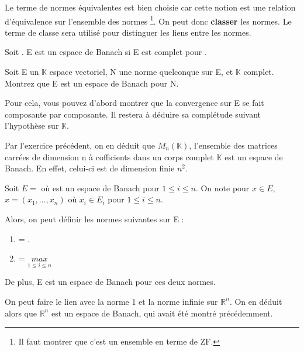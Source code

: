 Le terme de normes équivalentes est bien choisie car cette notion est une
relation d'équivalence sur l'ensemble des normes \footnote{Il faut montrer que
c'est un ensemble en terme de ZF.}.
On peut donc \textbf{classer} les normes. Le terme de classe sera utilisé pour
distinguer les liens entre les normes.

\begin{definition}
	Soit . E est un espace de Banach si E est
	complet pour .
\end{definition}

\begin{exercice}
	Soit E un $\mathbb{K}$ espace vectoriel, N une norme quelconque sur E, et
	$\mathbb{K}$ complet. 
	Montrez que E est un espace de Banach pour N.
	
	Pour cela, vous pouvez d'abord montrer que la convergence sur E se fait
	composante par composante. Il restera à déduire sa complétude suivant
	l'hypothèse sur $\mathbb{K}$.
\end{exercice}

\begin{exemple}
	Par l'exercice précédent, on en déduit que $M_{n}(\mathbb{K})$, l'ensemble
	des matrices carrées de dimension n à cofficients dans un corps complet
	$\mathbb{K}$ est un espace de Banach. En effet, celui-ci est de dimension
	finie $n^{2}$.
\end{exemple}

\begin{proposition}
	\label{product_norm_space}
	Soit $E = $ où 
	est un espace de Banach pour $1 \leq i \leq n$.
	On note pour $x \in E$, $x = (x_{1}, \ldots, x_{n})$ où $x_{i} \in
	E_{i}$ pour $1 \leq i \leq n$.
	
	Alors, on peut définir les normes suivantes sur E :
	\begin{enumerate}
		\item {} = .
		\item {} = $\underset{1 \leq i \leq
			n}{max}$
	\end{enumerate}

	De plus, E est un espace de Banach pour ces deux normes.
\end{proposition}

\begin{exemple}
	On peut faire le lien avec la norme 1 et la norme infinie sur
	$\mathbb{R}^{n}$. On en déduit alors que $\mathbb{R}^{n}$ est un espace de
	Banach, qui avait été montré précédemment.
\end{exemple}

